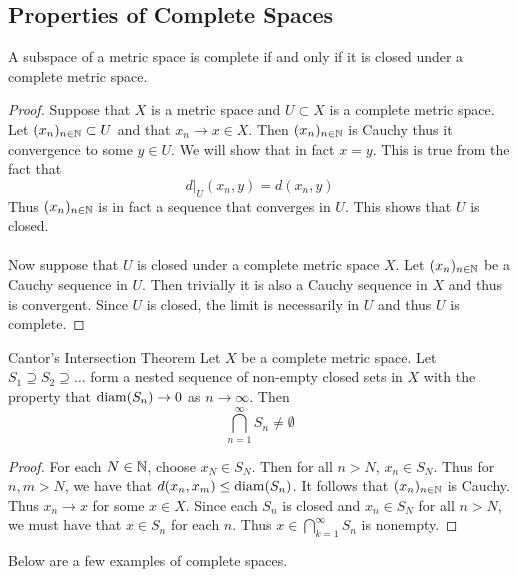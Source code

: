 \documentclass[a4paper]{article}
\begin{document}
\subsection{Properties of Complete Spaces}
\begin{prp}{}{} A subspace of a metric space is complete if and only if it is closed under a complete metric space. \tcbline
\begin{proof}
Suppose that $X$ is a metric space and $U\subset X$ is a complete metric space. Let $(x_n)_{n\in\mathbb{N}}\subset U$ and that $x_n\to x\in X$. Then $(x_n)_{n\in\mathbb{N}}$ is Cauchy thus it convergence to some $y\in U$. We will show that in fact $x=y$. This is true from the fact that $$d|_U(x_n,y)=d(x_n,y)$$ Thus $(x_n)_{n\in\mathbb{N}}$ is in fact a sequence that converges in $U$. This shows that $U$ is closed. \\~\\
Now suppose that $U$ is closed under a complete metric space $X$. Let $(x_n)_{n\in\mathbb{N}}$ be a Cauchy sequence in $U$. Then trivially it is also a Cauchy sequence in $X$ and thus is convergent. Since $U$ is closed, the limit is necessarily in $U$ and thus $U$ is complete. 
\end{proof}
\end{prp}

\begin{thm}{Cantor's Intersection Theorem}{} Let $X$ be a complete metric space. Let $S_1\supseteq S_2\supseteq\dots$ form a nested sequence of non-empty closed sets in $X$ with the property that $\operatorname{diam}(S_n)\to 0$ as $n\to\infty$. Then $$\bigcap_{n=1}^\infty S_n\neq\emptyset$$ \tcbline
\begin{proof}
For each $N\in\mathbb{N}$, choose $x_N\in S_N$. Then for all $n>N$, $x_n\in S_N$. Thus for $n,m>N$, we have that $d(x_n,x_m)\leq\operatorname{diam}(S_n)$. It follows that $(x_n)_{n\in\mathbb{N}}$ is Cauchy. Thus $x_n\to x$ for some $x\in X$. Since each $S_n$ is closed and $x_n\in S_N$ for all $n>N$, we must have that $x\in S_n$ for each $n$. Thus $x\in\bigcap_{k=1}^\infty S_n$ is nonempty. 
\end{proof}
\end{thm}

Below are a few examples of complete spaces. 
\end{document}
